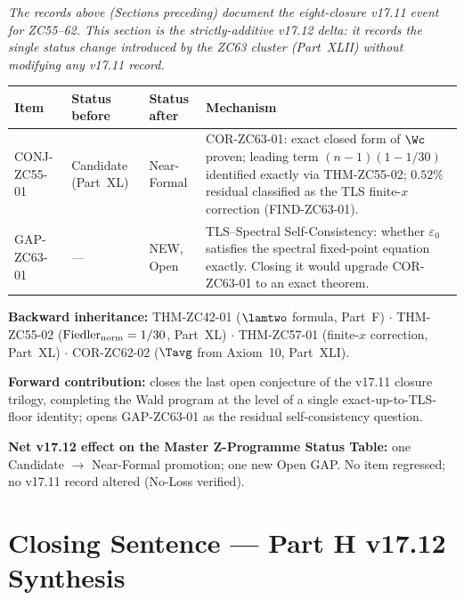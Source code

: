 \documentclass[12pt, a4paper]{article}
\begin{document}
\noindent
\textit{The records above (Sections preceding) document the eight-closure
v17.11 event for ZC55--62. This section is the strictly-additive v17.12
delta: it records the single status change introduced by the ZC63 cluster
(Part~XLII) without modifying any v17.11 record.}

\medskip
\begin{conmapbox}[title={v17.12 Status-Change Record (additive)}]
\begin{longtable}{@{}p{3.4cm}p{2.6cm}p{2.6cm}p{4.6cm}@{}}
\toprule
Item & Status before & Status after & Mechanism \\
\midrule
CONJ-ZC55-01 & Candidate (Part~XL) & Near-Formal & COR-ZC63-01: exact
closed form of $\Wc$ proven; leading term $(n-1)(1-1/30)$ identified
exactly via THM-ZC55-02; $0.52\%$ residual classified as the TLS
finite-$x$ correction (FIND-ZC63-01). \\
\addlinespace
GAP-ZC63-01 & --- & NEW, Open & TLS--Spectral Self-Consistency: whether
$\varepsilon_0$ satisfies the spectral fixed-point equation exactly.
Closing it would upgrade COR-ZC63-01 to an exact theorem. \\
\bottomrule
\end{longtable}
\end{conmapbox}

\medskip
\begin{conmapbox}[title={ZC63 Connection Record}]
\textbf{Backward inheritance:} THM-ZC42-01 ($\lamtwo$ formula, Part~F)
$\cdot$ THM-ZC55-02 ($\mathrm{Fiedler}_{\rm norm}=1/30$, Part~XL)
$\cdot$ THM-ZC57-01 (finite-$x$ correction, Part~XL)
$\cdot$ COR-ZC62-02 ($\Tavg$ from Axiom~10, Part~XLI).

\smallskip
\textbf{Forward contribution:} closes the last open conjecture of the
v17.11 closure trilogy, completing the Wald program at the level of a
single exact-up-to-TLS-floor identity; opens GAP-ZC63-01 as the residual
self-consistency question.

\smallskip
\textbf{Net v17.12 effect on the Master Z-Programme Status Table:}
one Candidate $\to$ Near-Formal promotion; one new Open GAP. No item
regressed; no v17.11 record altered (No-Loss verified).
\end{conmapbox}

\bigskip

\section{Closing Sentence --- Part H v17.12 Synthesis}
\label{sec:xlii-closing}
\end{document}
